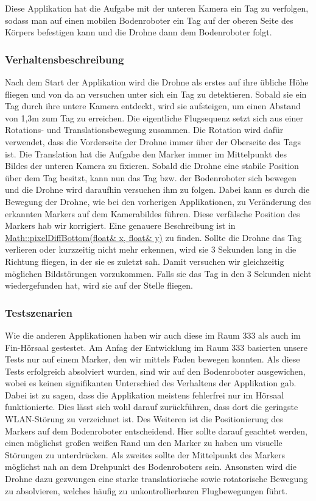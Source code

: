 Diese Applikation hat die Aufgabe mit der unteren Kamera ein Tag zu verfolgen, sodass man auf einen mobilen Bodenroboter ein Tag auf der oberen Seite des Körpers befestigen kann und die Drohne dann dem Bodenroboter folgt.

\subsubsection*{Verhaltensbeschreibung }

Nach dem Start der Applikation wird die Drohne als erstes auf ihre übliche Höhe fliegen und von da an versuchen unter sich ein Tag zu detektieren. Sobald sie ein Tag durch ihre untere Kamera entdeckt, wird sie aufsteigen, um einen Abstand von 1,3m zum Tag zu erreichen. Die eigentliche Flugsequenz setzt sich aus einer Rotations-\/ und Translationsbewegung zusammen. Die Rotation wird dafür verwendet, dass die Vorderseite der Drohne immer über der Oberseite des Tags ist. Die Translation hat die Aufgabe den Marker immer im Mittelpunkt des Bildes der unteren Kamera zu fixieren. Sobald die Drohne eine stabile Position über dem Tag besitzt, kann nun das Tag bzw. der Bodenroboter sich bewegen und die Drohne wird daraufhin versuchen ihm zu folgen. Dabei kann es durch die Bewegung der Drohne, wie bei den vorherigen Applikationen, zu Veränderung des erkannten Markers auf dem Kamerabildes führen. Diese verfälsche Position des Markers hab wir korrigiert. Eine genauere Beschreibung ist in \hyperlink{namespace_math_a25b9284eb485b732c952786b63343aaa}{Math::pixelDiffBottom(float\& x, float\& y)} zu finden. Sollte die Drohne das Tag verlieren oder kurzzeitig nicht mehr erkennen, wird sie 3 Sekunden lang in die Richtung fliegen, in der sie es zuletzt sah. Damit versuchen wir gleichzeitig möglichen Bildstörungen vorzukommen. Falls sie das Tag in den 3 Sekunden nicht wiedergefunden hat, wird sie auf der Stelle fliegen.

\subsubsection*{Testszenarien}

Wie die anderen Applikationen haben wir auch diese im Raum 333 als auch im Fin-\/Hörsaal gestestet. Am Anfag der Entwicklung im Raum 333 basierten unsere Tests nur auf einem Marker, den wir mittels Faden bewegen konnten. Als diese Tests erfolgreich absolviert wurden, sind wir auf den Bodenroboter ausgewichen, wobei es keinen signifikanten Unterschied des Verhaltens der Applikation gab. Dabei ist zu sagen, dass die Applikation meistens fehlerfrei nur im Hörsaal funktionierte. Dies lässt sich wohl darauf zurückführen, dass dort die geringste WLAN-\/Störung zu verzeichnet ist. Des Weiteren ist die Positionierung des Markers auf dem Bodenroboter entscheidend. Hier sollte darauf geachtet werden, einen möglichst großen weißen Rand um den Marker zu haben um visuelle Störungen zu unterdrücken. Als zweites sollte der Mittelpunkt des Markers möglichst nah an dem Drehpunkt des Bodenroboters sein. Ansonsten wird die Drohne dazu gezwungen eine starke translatiorische sowie rotatorische Bewegung zu absolvieren, welches häufig zu unkontrollierbaren Flugbewegungen führt.


